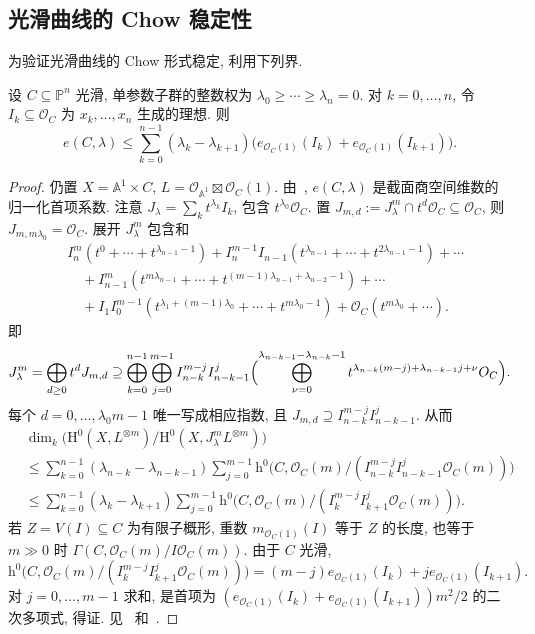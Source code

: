 \subsection{光滑曲线的 Chow 稳定性}\label{src:6.8.4-subsection}
为验证光滑曲线的 Chow 形式稳定, 利用下列界.
\begin{proposition}\label{src:6.8.19}
设 $C\subseteq\mathbb P^n$ 光滑, 单参数子群的整数权为 $\lambda_0\geq\cdots\geq\lambda_n=0$. 对 $k=0,\allowbreak \ldots,\allowbreak n$, 令 $I_k\subseteq\mathcal O_C$ 为 $x_k,\allowbreak \ldots,\allowbreak x_n$ 生成的理想. 则
\[
e(C,\lambda)\leq\sum_{k=0}^{n-1}(\lambda_k-\lambda_{k+1})
\bigl(e_{\mathcal O_C(1)}(I_k)+e_{\mathcal O_C(1)}(I_{k+1})\bigr).
\]
\end{proposition}
\begin{proof}
仍置 $X=\mathbb A^1\times C$, $L=\mathcal O_{\mathbb A^1}\boxtimes\mathcal O_C(1)$. 由~, $e(C,\allowbreak \lambda)$ 是截面商空间维数的归一化首项系数. 注意 $J_\lambda=\sum_k t^{\lambda_k}I_k$, 包含 $t^{\lambda_0}\mathcal O_C$. 置 $J_{m,\allowbreak d}:=J_\lambda^m\cap t^d\mathcal O_C\subseteq\mathcal O_C$, 则 $J_{m,\allowbreak m\lambda_0}=\mathcal O_C$. 展开 $J_\lambda^m$ 包含和
\[
\begin{aligned}
&I_n^m(t^0+\cdots+t^{\lambda_{n-1}-1})
+I_n^{m-1}I_{n-1}(t^{\lambda_{n-1}}+\cdots+t^{2\lambda_{n-1}-1})+\cdots\\
&\quad+I_{n-1}^m(t^{m\lambda_{n-1}}+\cdots+t^{(m-1)\lambda_{n-1}+\lambda_{n-2}-1})+\cdots\\
&\quad+I_1I_0^{m-1}(t^{\lambda_1+(m-1)\lambda_0}+\cdots+t^{m\lambda_0-1})
+\mathcal O_C(t^{m\lambda_0}+\cdots).
\end{aligned}
\]
即
\[
\begin{aligned}
J_\lambda^m=\bigoplus_{d\geq0}t^dJ_{m,d}
\supseteq\bigoplus_{k=0}^{n-1}\bigoplus_{j=0}^{m-1}
I_{n-k}^{m-j}I_{n-k-1}^j
\Bigl(\bigoplus_{\nu=0}^{\lambda_{n-k-1}-\lambda_{n-k}-1}
t^{\lambda_{n-k}(m-j)+\lambda_{n-k-1}j+\nu}\mathcal O_C\Bigr).
\end{aligned}
\]
每个 $d=0,\allowbreak \ldots,\allowbreak \lambda_0m-1$ 唯一写成相应指数, 且 $J_{m,\allowbreak d}\supseteq I_{n-k}^{m-j}I_{n-k-1}^j$. 从而
\[
\begin{aligned}
&\dim_k\bigl(\mathrm H^0(X,L^{\otimes m})/\mathrm H^0(X,J_\lambda^mL^{\otimes m})\bigr)\\
&\leq\sum_{k=0}^{n-1}(\lambda_{n-k}-\lambda_{n-k-1})
\sum_{j=0}^{m-1}\mathrm h^0\bigl(C,\mathcal O_C(m)/(I_{n-k}^{m-j}I_{n-k-1}^j\mathcal O_C(m))\bigr)\\
&\leq\sum_{k=0}^{n-1}(\lambda_k-\lambda_{k+1})
\sum_{j=0}^{m-1}\mathrm h^0\bigl(C,\mathcal O_C(m)/(I_k^{m-j}I_{k+1}^j\mathcal O_C(m))\bigr).
\end{aligned}
\]
若 $Z=V(I)\subseteq C$ 为有限子概形, 重数 $m_{\mathcal O_C(1)}(I)$ 等于 $Z$ 的长度, 也等于 $m\gg0$ 时 $\Gamma(C,\allowbreak \mathcal O_C(m)/I\mathcal O_C(m))$. 由于 $C$ 光滑,
\[
\mathrm h^0\bigl(C,\mathcal O_C(m)/(I_k^{m-j}I_{k+1}^j\mathcal O_C(m))\bigr)
=(m-j)e_{\mathcal O_C(1)}(I_k)+je_{\mathcal O_C(1)}(I_{k+1}).
\]
对 $j=0,\allowbreak \ldots,\allowbreak m-1$ 求和, 是首项为 $(e_{\mathcal O_C(1)}(I_k)+e_{\mathcal O_C(1)}(I_{k+1}))m^2/2$ 的二次多项式, 得证. 见~\cite[定理 1.0.0]{Gie82} 和~\cite[命题 4.10--11]{Mum77}.
\end{proof}

